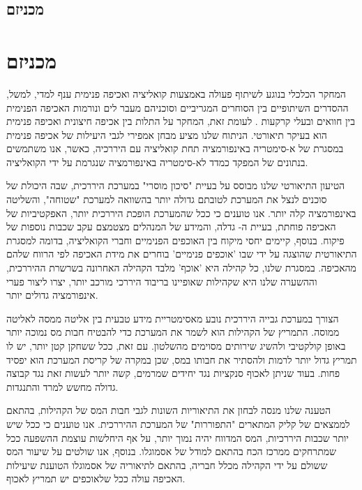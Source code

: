 \subsection{מכניזם}
\section{מכניזם}

המחקר הכלכלי בנוגע לשיתוף פעולה באמצעות קואליציה ואכיפה פנימית ענף למדי, למשל, ההסדרים השיתופיים בין הסוחרים המגריביים וסוכניהם מעבר לים \cite{greif_contract_1993} ונורמות האכיפה הפנימית בין חוואים ובעלי קרקעות . לעומת זאת, המחקר על התלות בין אכיפה חיצונית ואכיפה פנימית הוא בעיקר תיאורטי. הניתוח שלנו מציע מבחן אמפירי לגבי 
היעילות של אכיפה פנימית במסגרת של א-סימטריה באינפורמציה תחת קואליציה עם היררכיה, כאשר, אנו משתמשים בנתונים של המפקד כמדד לא-סימטריה באינפורמציה שנגרמת על ידי הקואליציה.

הטיעון התיאורטי שלנו מבוסס על בעיית "סיכון מוסרי"  במערכת היררכית, שבה היכולת של סוכנים לנצל את המערכת לטובתם גדולה יותר בהשוואה למערכת "שטוחה", והשליטה באינפורמציה קלה יותר. אנו טוענים כי ככל שהמערכת הופכת היררכית יותר, האפקטיביות של האכיפה פוחתת, בעיית ה- גדלה, והמידע של המנהלים מצטמצם עקב שכבות נוספות של פיקוח.  
בנוסף, קיימים יחסי מיקוח בין האוכפים הפנימיים וחברי הקואליציה,  בדומה למסגרת התיאורטית שהוצגה על ידי   שבו 'אוכפים פנימיים' בוחרים את מידת האכיפה לפי הרווח שלהם מהאכיפה. במסגרת שלנו, כל קהילה היא 'אוכף' מלבד הקהילה האחרונה בשרשרת ההיררכית, וההשערה שלנו היא שקהילות שאופיינו בריבוד היררכי מורכב יותר, יצרו ליצור פערי אינפורמציה גדולים יותר.

הצורך במערכת גבייה היררכית נובע מאסימטריית מידע טבעית בין אליטה ממסה לאליטה ממוסה. התמריץ של הקהילות הוא לשמר את המערכת כדי להבטיח חבות מס נמוכה יותר באופן קולקטיבי ולהשיג שירותים מסוימים מהשלטון. עם זאת, ככל ששחקן קטן יותר, יש לו תמריץ גדול יותר לרמות ולהסתיר את חבותו במס, שכן במקרה של קריסת המערכת הוא יפסיד פחות. בעוד שניתן לאכוף סנקציות נגד יחידים שמרמים, קשה יותר לעשות זאת נגד קבוצה גדולה מחשש למרד והתנגדות. 

הטענה שלנו מנסה לבחון את התיאוריות השונות לגבי חבות המס של הקהילות, בהתאם לממצאים של קליק המתארים "התפוררות" של המערכת ההיררכית. אנו טוענים כי ככל שיש יותר שכבות היררכיות, המס המדווח יהיה נמוך יותר, על אף היחלשות עוצמת ההשפעה ככל שמתרחקים ממרכז הכח בהתאם למודל של אסמוגלו. בנוסף, אנו שולטים על שיעור המס ששולם על ידי הקהילה מכלל חבריה, בהתאם לתיאוריה של אסמוגלו הטוענת שיעילות האכיפה עולה ככל שלאוכפים יש תמריץ לאכוף.

